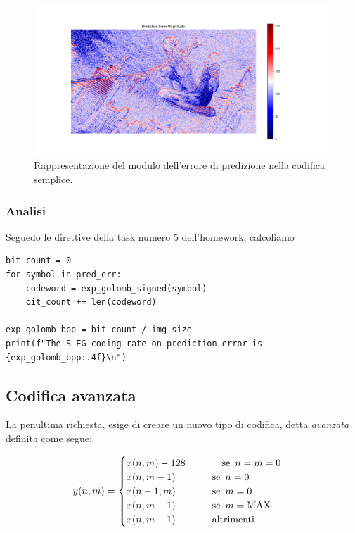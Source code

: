 \begin{figure}[h]
    \centering
    \includegraphics[width = .9\textwidth]{hw-1/report/imgs/simple-coding.png}
    \caption{Rappresentazione del modulo dell'errore di predizione nella codifica semplice.}
    \label{fig:simple-coding}
\end{figure}







\subsubsection{Analisi} 
Seguedo le direttive della task numero 5 dell'homework, calcoliamo 

\begin{lstlisting}
bit_count = 0
for symbol in pred_err:
    codeword = exp_golomb_signed(symbol)
    bit_count += len(codeword)

exp_golomb_bpp = bit_count / img_size
print(f"The S-EG coding rate on prediction error is {exp_golomb_bpp:.4f}\n")
\end{lstlisting}



\vspace{15px}\subsection{Codifica avanzata}

La penultima richiesta, esige di creare un nuovo tipo di codifica, detta \textsl{avanzata} definita come segue:

\begin{gather*}
    y(n, m) = 
    \begin{cases}
        x(n, m) - 128 \hspace{37px} \text{se } \, n = m = 0 \\
        x(n, m - 1) \hspace{37px} \text{se } \, n = 0\\
        x(n - 1, m) \hspace{37px} \text{se } \, m = 0\\
        x(n, m - 1) \hspace{37px} \text{se } \, m = \text{MAX}\\
        x(n, m - 1) \hspace{37px} \text{altrimenti}
    \end{cases}
\end{gather*} 

